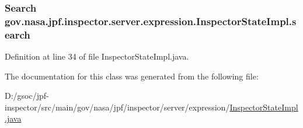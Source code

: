 \subsubsection[{\texorpdfstring{search}{search}}]{\setlength{\rightskip}{0pt plus 5cm}Search gov.\+nasa.\+jpf.\+inspector.\+server.\+expression.\+Inspector\+State\+Impl.\+search\hspace{0.3cm}{\ttfamily [private]}}\hypertarget{classgov_1_1nasa_1_1jpf_1_1inspector_1_1server_1_1expression_1_1_inspector_state_impl_aad68b55c445091d252a965081641b48f}{}\label{classgov_1_1nasa_1_1jpf_1_1inspector_1_1server_1_1expression_1_1_inspector_state_impl_aad68b55c445091d252a965081641b48f}


Definition at line 34 of file Inspector\+State\+Impl.\+java.



The documentation for this class was generated from the following file\+:\begin{DoxyCompactItemize}
\item 
D\+:/gsoc/jpf-\/inspector/src/main/gov/nasa/jpf/inspector/server/expression/\hyperlink{_inspector_state_impl_8java}{Inspector\+State\+Impl.\+java}\end{DoxyCompactItemize}

